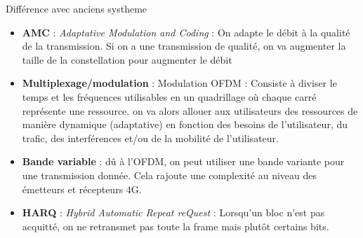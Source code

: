  			Différence avec anciens systheme
 			\begin{itemize}
 				\item \textbf{AMC} : \textit{Adaptative Modulation and Coding} : On adapte le débit à la qualité de la transmission. Si on a une transmission de qualité, on va augmenter la taille de la constellation pour augmenter le débit
 				\item \textbf{Multiplexage/modulation} : Modulation OFDM : Consiste à diviser le temps et les fréquences utilisables en un quadrillage où chaque carré représente une ressource. on va alors allouer aux utilisateurs des ressources de manière dynamique (adaptative) en fonction des besoins de l’utilisateur, du trafic, des interférences et/ou de la mobilité de l’utilisateur.
 				\item \textbf{Bande variable} : dû à l’OFDM, on peut utiliser une bande variante pour une transmission donnée. Cela rajoute une complexité au niveau des émetteurs et récepteurs 4G. 
 				\item \textbf{HARQ} : \textit{Hybrid Automatic Repeat reQuest} : Lorsqu’un bloc n’est pas acquitté, on ne retransmet pas toute la frame mais plutôt certains bits.
 			\end{itemize}